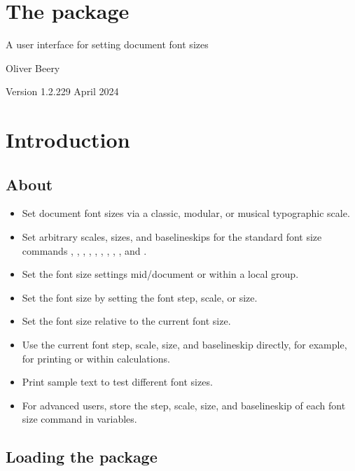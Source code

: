 \documentclass{beery}
\begin{document}
\section*
  {%
    The  package%
  }

A user interface for setting document font sizes

Oliver Beery

Version 1.2.2\quad{}29 April 2024


\section{Introduction}
\label{sec:intro}

\subsection{About}
\label{subsec:about}

\begin{itemize}
  \item
  Set document font sizes via a classic, modular, or musical typographic scale.
  \item
  Set arbitrary scales, sizes, and baselineskips for the standard font size commands , , , , , , , , , and .
  \item
  Set the font size settings mid\-/document or within a local group.
  \item
  Set the font size by setting the font step, scale, or size.
  \item
  Set the font size relative to the current font size.
  \item
  Use the current font step, scale, size, and baselineskip directly, for example, for printing or within calculations.
  \item
  Print sample text to test different font sizes.
  \item
  For advanced users, store the step, scale, size, and baselineskip of each font size command in  variables.
\end{itemize}

\subsection{Loading the package}
\label{subsec:loading}
\end{document}
